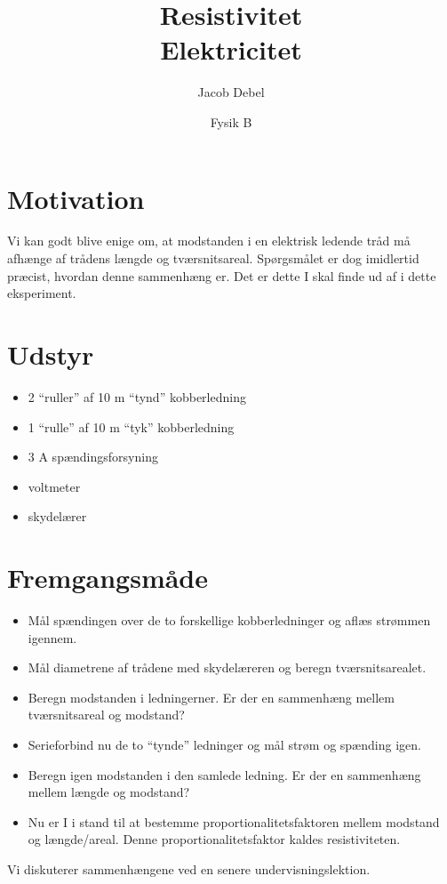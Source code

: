 \documentclass[a4paper, 12pt]{article}
\author{Jacob Debel}
\date{Fysik B}
\title{Resistivitet\\\medskip
\large Elektricitet}
\begin{document}
\maketitle

\section*{Motivation}
\label{sec:orga8002ca}
Vi kan godt blive enige om, at modstanden i en elektrisk ledende tråd må afhænge af trådens længde og tværsnitsareal. Spørgsmålet er dog imidlertid præcist, hvordan denne sammenhæng er.
Det er dette I skal finde ud af i dette eksperiment.
\section*{Udstyr}
\label{sec:org37ad34e}
\begin{itemize}
\item 2 “ruller” af 10 m “tynd” kobberledning
\item 1 “rulle” af 10 m “tyk” kobberledning
\item 3 A spændingsforsyning
\item voltmeter
\item skydelærer
\end{itemize}
\section*{Fremgangsmåde}
\label{sec:org8ab376f}
\begin{itemize}
\item Mål spændingen over de to forskellige kobberledninger og aflæs strømmen igennem.
\item Mål diametrene af trådene med skydelæreren og beregn tværsnitsarealet.
\item Beregn modstanden i ledningerner. Er der en sammenhæng mellem tværsnitsareal og modstand?
\item Serieforbind  nu de to “tynde” ledninger og mål strøm og spænding igen.
\item Beregn igen modstanden i den samlede ledning. Er der en sammenhæng mellem længde og modstand?
\item Nu er I i stand til at bestemme proportionalitetsfaktoren mellem modstand og længde/areal. Denne proportionalitetsfaktor kaldes resistiviteten.
\end{itemize}

Vi diskuterer sammenhængene ved en senere undervisningslektion.
\end{document}
